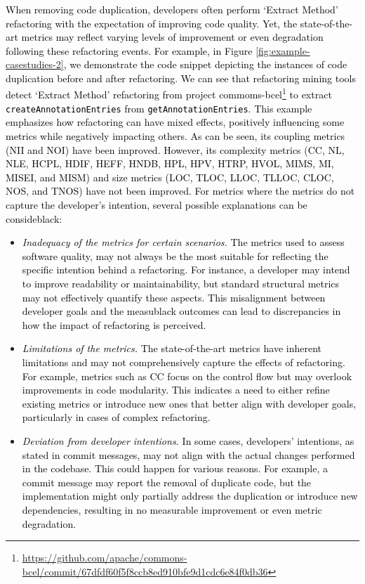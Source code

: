\noindent{\textbf{ \textcolor{black}{Lesson 3: Some state-of-the-art metrics can capture the developer’s intention of removing code duplication with different degrees of improvement and degradation of software quality.}}} \textcolor{black}{When removing code duplication, developers often perform `Extract Method' refactoring with the expectation of improving code quality. Yet, the state-of-the-art metrics may reflect varying levels of improvement or even degradation following these refactoring events.  For example, in Figure \ref{fig:example-casestudies-2}, we demonstrate the code snippet depicting the instances of code duplication before and after refactoring. We can see that refactoring mining tools detect `Extract Method' refactoring from project commoms-bcel\footnote{\textcolor{black}{\url{https://github.com/apache/commons-bcel/commit/67dfdf60f5f8ccb8ed910bfe9d1cdc6e84f0db36}}}  to extract \texttt{createAnnotationEntries} from \texttt{getAnnotationEntries}. This example emphasizes how refactoring can have mixed effects, positively influencing some metrics while negatively impacting others. As can be seen, its coupling metrics (NII and NOI) have been improved. However, its complexity metrics (CC, NL, NLE, HCPL, HDIF, HEFF, HNDB, HPL, HPV, HTRP, HVOL, MIMS, MI, MISEI, and MISM) and size metrics (LOC, TLOC, LLOC, TLLOC, CLOC, NOS, and TNOS) have not been improved. For metrics where the metrics do not capture the developer's intention, several possible explanations can be consideblack: }
\begin{itemize}
    \item \textcolor{black}{\textit{Inadequacy of the metrics for certain scenarios.} The metrics used to assess software quality, may not always be the most suitable for reflecting the specific intention behind a refactoring. For instance, a developer may intend to improve readability or maintainability, but standard structural metrics may not effectively quantify these aspects. This misalignment between developer goals and the measublack outcomes can lead to discrepancies in how the impact of refactoring is perceived.}
    \item \textcolor{black}{\textit{Limitations of the metrics.} The state-of-the-art metrics have inherent limitations and may not comprehensively capture the effects of refactoring. For example, metrics such as CC focus on the control flow but may overlook improvements in code modularity. This indicates a need to either refine existing metrics or introduce new ones that better align with developer goals, particularly in cases of complex refactoring.}
    \item \textcolor{black}{\textit{Deviation from developer intentions.} In some cases, developers' intentions, as stated in commit messages, may not align with the actual changes performed in the codebase. This could happen for various reasons. For example, a commit message may report the removal of duplicate code, but the implementation might only partially address the duplication or introduce new dependencies, resulting in no measurable improvement or even metric degradation.}
\end{itemize}

